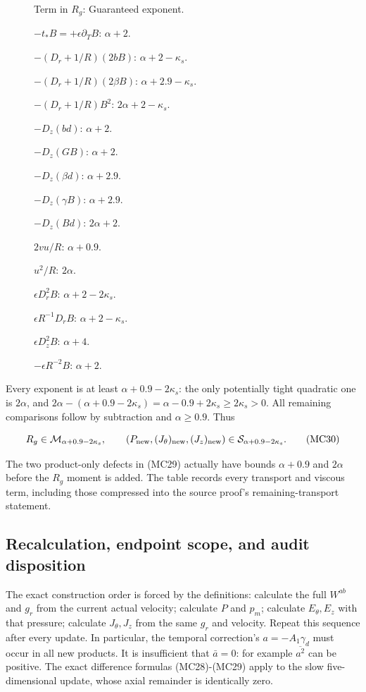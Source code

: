 \documentclass[10pt,a4paper]{article}
\begin{document}
\begin{description}
\item[] Term in \(R_g\): Guaranteed exponent.
\item[] \(-t_*B=+\epsilon\partial_TB\): \(\alpha+2\).
\item[] \(-(D_r+1/R)(2bB)\): \(\alpha+2-\kappa_s\).
\item[] \(-(D_r+1/R)(2\beta B)\): \(\alpha+2.9-\kappa_s\).
\item[] \(-(D_r+1/R)B^2\): \(2\alpha+2-\kappa_s\).
\item[] \(-D_z(bd)\): \(\alpha+2\).
\item[] \(-D_z(GB)\): \(\alpha+2\).
\item[] \(-D_z(\beta d)\): \(\alpha+2.9\).
\item[] \(-D_z(\gamma B)\): \(\alpha+2.9\).
\item[] \(-D_z(Bd)\): \(2\alpha+2\).
\item[] \(2vu/R\): \(\alpha+0.9\).
\item[] \(u^2/R\): \(2\alpha\).
\item[] \(\epsilon D_r^2B\): \(\alpha+2-2\kappa_s\).
\item[] \(\epsilon R^{-1}D_rB\): \(\alpha+2-\kappa_s\).
\item[] \(\epsilon D_z^2B\): \(\alpha+4\).
\item[] \(-\epsilon R^{-2}B\): \(\alpha+2\).
\end{description}

Every exponent is at least \(\alpha+0.9-2\kappa_s\): the only potentially tight quadratic one is \(2\alpha\), and \(2\alpha-(\alpha+0.9-2\kappa_s)=\alpha-0.9+2\kappa_s\ge2\kappa_s>0\). All remaining comparisons follow by subtraction and \(\alpha\ge0.9\). Thus

\[
R_g\in\mathcal M_{\alpha+0.9-2\kappa_s},\qquad
(P_{\rm new},(J_\theta)_{\rm new},(J_z)_{\rm new})
\in\mathcal S_{\alpha+0.9-2\kappa_s}.
\tag{MC30}
\]

The two product-only defects in (MC29) actually have bounds \(\alpha+0.9\) and \(2\alpha\) before the \(R_g\) moment is added. The table records every transport and viscous term, including those compressed into the source proof's remaining-transport statement.

\subsection{Recalculation, endpoint scope, and audit disposition}

The exact construction order is forced by the definitions: calculate the full \(W^{ab}\) and \(g_r\) from the current actual velocity; calculate \(P\) and \(p_m\); calculate \(E_\theta,E_z\) with that pressure; calculate \(J_\theta,J_z\) from the same \(g_r\) and velocity. Repeat this sequence after every update. In particular, the temporal correction's \(a=-A_1\gamma_d\) must occur in all new products. It is insufficient that \(\bar a=0\): for example \(\overline{a^2}\) can be positive. The exact difference formulas (MC28)-(MC29) apply to the slow five-dimensional update, whose axial remainder is identically zero.
\end{document}
